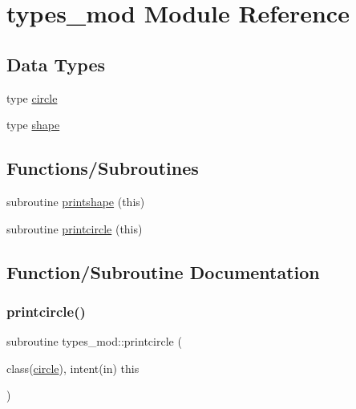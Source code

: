 \hypertarget{namespacetypes__mod}{}\section{types\+\_\+mod Module Reference}
\label{namespacetypes__mod}
\subsection*{Data Types}
\begin{DoxyCompactItemize}
\item 
type \mbox{\hyperlink{structtypes__mod_1_1circle}{circle}}
\item 
type \mbox{\hyperlink{structtypes__mod_1_1shape}{shape}}
\end{DoxyCompactItemize}
\subsection*{Functions/\+Subroutines}
\begin{DoxyCompactItemize}
\item 
subroutine \mbox{\hyperlink{namespacetypes__mod_ab09448209b0b127b46bc8fa8bf29b739}{printshape}} (this)
\item 
subroutine \mbox{\hyperlink{namespacetypes__mod_ae45a0e69dfbf27364378a9d1e7f71f99}{printcircle}} (this)
\end{DoxyCompactItemize}


\subsection{Function/\+Subroutine Documentation}
\mbox{\label{namespacetypes__mod_ae45a0e69dfbf27364378a9d1e7f71f99}} 
\subsubsection{\texorpdfstring{printcircle()}{printcircle()}}
{\footnotesize\ttfamily subroutine types\+\_\+mod\+::printcircle (\begin{DoxyParamCaption}\item[{class(\mbox{\hyperlink{structtypes__mod_1_1circle}{circle}}), intent(in)}]{this }\end{DoxyParamCaption})\hspace{0.3cm}{\ttfamily [private]}}



